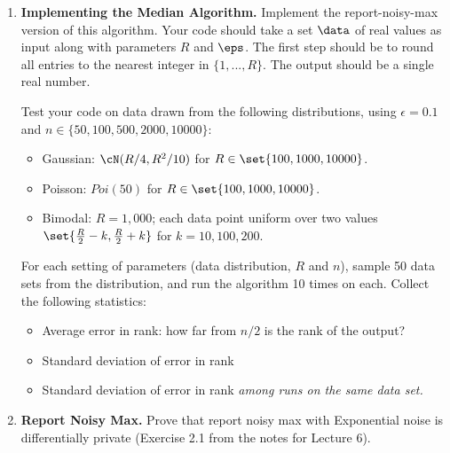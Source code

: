 \documentclass[11pt]{article}
\begin{document}
\begin{enumerate}[leftmargin=\parindent, itemsep=3ex]
\begin{enumerate}

        \end{enumerate}

          \item \textbf{Implementing the Median Algorithm.} Implement the report-noisy-max version of this
            algorithm. Your code should take a set $\data$ of real
            values as input along with parameters $R$ and $\eps$. The
            first step should be to round all entries to the nearest
            integer in $\{1,...,R\}$. The output should be a single
            real number.

           Test your code on data drawn from the following
           distributions, using $\epsilon = 0.1$ and $n \in \{50,100,500, 2000, 10000\}$:
           \begin{itemize}
           \item Gaussian: $\cN(R/4, R^2/10)$ for $R \in
             \set{100,1000,10000}$.
           \item Poisson: $\textit{Poi}(50)$ for $R \in 
             \set{100,1000,10000}$.
           \item Bimodal: $R=1,000$; each data point uniform over two
             values $\set{\frac{R}{2}-k, \frac{R}{2}+k}$ for $k = 10, 100, 200$.
             \end{itemize}
             For each setting of parameters (data distribution, $R$
             and $n$), sample 50 data sets from the distribution, and
             run the algorithm 10 times on each. Collect the following
             statistics:
             \begin{itemize}
             \item Average error in rank: how far from $n/2$ is the
               rank of the output?
             \item Standard deviation of error in rank
             \item Standard deviation of error in rank \emph{among runs on
               the same data set.}
           \end{itemize}

         
        
\item \textbf{Report Noisy Max.} Prove that report noisy max with Exponential noise is differentially
  private (Exercise 2.1 from the notes for Lecture 6).


\end{enumerate}
\end{document}
